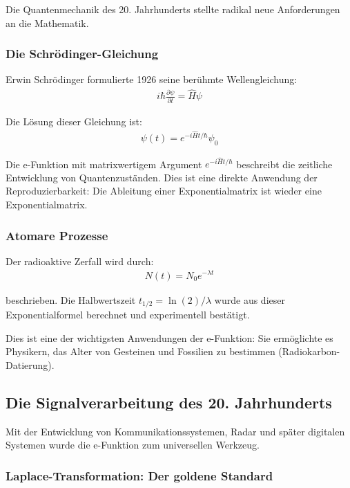 \documentclass[a4paper, 12pt, twoside, openright]{report}
\theoremstyle{definition}
\theoremstyle{definition}
\begin{document}
Die Quantenmechanik des 20. Jahrhunderts stellte radikal neue Anforderungen an die Mathematik.

\subsubsection*{Die Schrödinger-Gleichung}

Erwin Schrödinger formulierte 1926 seine berühmte Wellengleichung:
\begin{align}
	i\hbar \frac{\partial \psi}{\partial t} = \hat{H} \psi
\end{align}

Die Lösung dieser Gleichung ist:
\begin{align}
	\psi(t) = e^{-i\hat{H}t/\hbar} \psi_0
\end{align}

Die e-Funktion mit matrixwertigem Argument $e^{-i\hat{H}t/\hbar}$ beschreibt die zeitliche Entwicklung von Quantenzuständen. Dies ist eine direkte Anwendung der Reproduzierbarkeit: Die Ableitung einer Exponentialmatrix ist wieder eine Exponentialmatrix.

\subsubsection*{Atomare Prozesse}

Der radioaktive Zerfall wird durch:
\begin{align}
	N(t) = N_0 e^{-\lambda t}
\end{align}

beschrieben. Die Halbwertszeit $t_{1/2} = \ln(2)/\lambda$ wurde aus dieser Exponentialformel berechnet und experimentell bestätigt.

Dies ist eine der wichtigsten Anwendungen der e-Funktion: Sie ermöglichte es Physikern, das Alter von Gesteinen und Fossilien zu bestimmen (Radiokarbon-Datierung).

\subsection{Die Signalverarbeitung des 20. Jahrhunderts}

Mit der Entwicklung von Kommunikationssystemen, Radar und später digitalen Systemen wurde die e-Funktion zum universellen Werkzeug.

\subsubsection*{Laplace-Transformation: Der goldene Standard}
\end{document}
